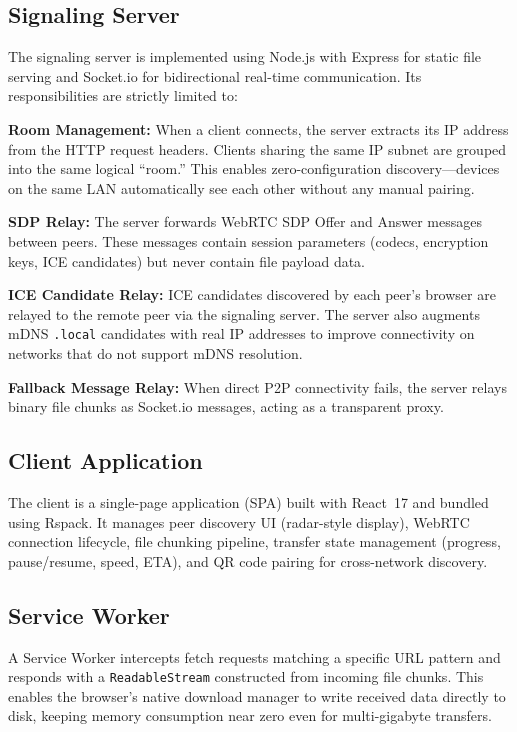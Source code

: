 \documentclass[conference]{IEEEtran}
\begin{document}
\subsection{Signaling Server}
The signaling server is implemented using Node.js with Express for static file serving and Socket.io for bidirectional real-time communication. Its responsibilities are strictly limited to:

\textbf{Room Management:} When a client connects, the server extracts its IP address from the HTTP request headers. Clients sharing the same IP subnet are grouped into the same logical ``room.'' This enables zero-configuration discovery---devices on the same LAN automatically see each other without any manual pairing.

\textbf{SDP Relay:} The server forwards WebRTC SDP Offer and Answer messages between peers. These messages contain session parameters (codecs, encryption keys, ICE candidates) but never contain file payload data.

\textbf{ICE Candidate Relay:} ICE candidates discovered by each peer's browser are relayed to the remote peer via the signaling server. The server also augments mDNS \texttt{.local} candidates with real IP addresses to improve connectivity on networks that do not support mDNS resolution.

\textbf{Fallback Message Relay:} When direct P2P connectivity fails, the server relays binary file chunks as Socket.io messages, acting as a transparent proxy.

\subsection{Client Application}
The client is a single-page application (SPA) built with React~17 and bundled using Rspack. It manages peer discovery UI (radar-style display), WebRTC connection lifecycle, file chunking pipeline, transfer state management (progress, pause/resume, speed, ETA), and QR code pairing for cross-network discovery.

\subsection{Service Worker}
A Service Worker intercepts fetch requests matching a specific URL pattern and responds with a \texttt{ReadableStream} constructed from incoming file chunks. This enables the browser's native download manager to write received data directly to disk, keeping memory consumption near zero even for multi-gigabyte transfers.
\end{document}
